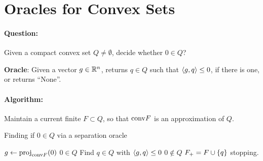 \section{Oracles for Convex Sets}

\paragraph{Question:} Given a compact convex set $Q \neq \emptyset$, decide
whether $0 \in Q$?

\textbf{Oracle}: Given a vector $g \in \mathbb{R}^n$, returns $q \in Q$ such that
$\left\langle g, q \right\rangle \leq 0$, if there is one, or returns ``None''.

\paragraph{Algorithm:} Maintain a current finite $F \subset Q$, so that
$\mathrm{conv}{F}$ is an approximation of $Q$.

\begin{algorithm}
	\caption{Finding if $0 \in Q$ via a separation oracle}
	\begin{algorithmic}
		\Repeat
			\State $g \gets \mathrm{proj}_{\mathrm{conv}{F}}(0)$
				\State \Return $0 \in Q$
			\EndIf
			\State Find $q \in Q$ with $\left\langle g, q \right\rangle \leq 0$
				\State \Return $0 \notin Q$
			\EndIf
			\State $F_+ = F \cup \left\{ q \right\}$
		\Until stopping.
	\end{algorithmic}
	\label{alg:sep-oracle}
\end{algorithm}

